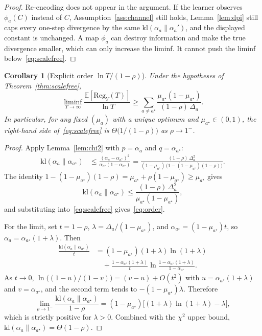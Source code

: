 \documentclass{article}
\newtheorem{corollary}[theorem]{Corollary}
\theoremstyle{definition}
\theoremstyle{remark}
\newcommand{\E}{\mathbb{E}}
\newcommand{\kl}{\mathrm{kl}}
\newcommand{\Reg}{\mathrm{Reg}}
\begin{document}
\begin{proof}
Re-encoding does not appear in the argument. If the learner observes $\phi_a(C)$ instead of $C$, Assumption~\ref{ass:channel} still holds, Lemma~\ref{lem:dpi} still caps every one-step divergence by the same $\kl(\alpha_a\|\alpha_a')$, and the displayed constant is unchanged. A map $\phi_a$ can destroy information and make the true divergence smaller, which can only increase the liminf. It cannot push the liminf below~\eqref{eq:scalefree}.
\end{proof}

\begin{corollary}[Explicit order $\ln T/(1-\rho)$]\label{cor:order}
Under the hypotheses of Theorem~\ref{thm:scalefree},
\begin{equation}\label{eq:order}
\liminf_{T\to\infty}\frac{\E[\Reg_Y(T)]}{\ln T}
\ge\sum_{a\neq a^\star}
\frac{\mu_{a^\star}(1-\mu_{a^\star})}{(1-\rho)\,\Delta_a}.
\end{equation}
In particular, for any fixed $(\mu_a)$ with a unique optimum and $\mu_{a^\star}\in(0,1)$, the right-hand side of~\eqref{eq:scalefree} is $\Theta\!\big(1/(1-\rho)\big)$ as $\rho\to 1^-$.
\end{corollary}

\begin{proof}
Apply Lemma~\ref{lem:chi2} with $p=\alpha_a$ and $q=\alpha_{a^\star}$:
\begin{align*}
\kl(\alpha_a\|\alpha_{a^\star})
&\le\frac{(\alpha_a-\alpha_{a^\star})^2}{\alpha_{a^\star}(1-\alpha_{a^\star})}
=\frac{(1-\rho)\,\Delta_a^2}{(1-\mu_{a^\star})\,\big(1-(1-\mu_{a^\star})(1-\rho)\big)}.
\end{align*}
The identity $1-(1-\mu_{a^\star})(1-\rho)=\mu_{a^\star}+\rho(1-\mu_{a^\star})\ge\mu_{a^\star}$ gives
\[
\kl(\alpha_a\|\alpha_{a^\star})
\le\frac{(1-\rho)\,\Delta_a^2}{\mu_{a^\star}(1-\mu_{a^\star})},
\]
and substituting into~\eqref{eq:scalefree} gives~\eqref{eq:order}.

For the limit, set $t=1-\rho$, $\lambda=\Delta_a/(1-\mu_{a^\star})$, and $\alpha_{a^\star}=(1-\mu_{a^\star})t$, so $\alpha_a=\alpha_{a^\star}(1+\lambda)$. Then
\begin{align*}
\frac{\kl(\alpha_a\|\alpha_{a^\star})}{t}
&=(1-\mu_{a^\star})(1+\lambda)\ln(1+\lambda)\\
&\quad+\frac{1-\alpha_{a^\star}(1+\lambda)}{t}
\ln\frac{1-\alpha_{a^\star}(1+\lambda)}{1-\alpha_{a^\star}}.
\end{align*}
As $t\to 0$, $\ln\!\big((1-u)/(1-v)\big)=(v-u)+O(t^2)$ with $u=\alpha_{a^\star}(1+\lambda)$ and $v=\alpha_{a^\star}$, and the second term tends to $-(1-\mu_{a^\star})\lambda$. Therefore
\begin{equation}\label{eq:limit}
\lim_{\rho\to 1^-}\frac{\kl(\alpha_a\|\alpha_{a^\star})}{1-\rho}
=(1-\mu_{a^\star})\big[(1+\lambda)\ln(1+\lambda)-\lambda\big],
\end{equation}
which is strictly positive for $\lambda>0$. Combined with the $\chi^2$ upper bound, $\kl(\alpha_a\|\alpha_{a^\star})=\Theta(1-\rho)$.
\end{proof}
\end{document}
